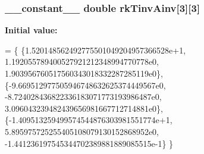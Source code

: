 \subsubsection[{\texorpdfstring{rk\+Tinv\+Ainv}{rkTinvAinv}}]{\setlength{\rightskip}{0pt plus 5cm}\+\_\+\+\_\+constant\+\_\+\+\_\+ double rk\+Tinv\+Ainv\mbox{[}3\mbox{]}\mbox{[}3\mbox{]}}\hypertarget{radau2a_8cu_a954ecd55208794555a1cd474035c742f}{}\label{radau2a_8cu_a954ecd55208794555a1cd474035c742f}
{\bfseries Initial value\+:}
\begin{DoxyCode}
= \{
\{1.520148562492775501049204957366528e+1,
1.192055789400527921212348994770778e0,
1.903956760517560343018332287285119e0\},
\{-9.669512977505946748632625374449567e0,
-8.724028436822336183071773193986487e0,
3.096043239482439656981667712714881e0\},
\{-1.409513259499574544876303981551774e+1,
5.895975725255405108079130152868952e0,
-1.441236197545344702389881889085515e-1\}
\}
\end{DoxyCode}
